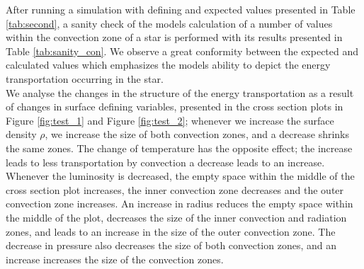 \documentclass[10pt, nofootinbib, twocolumn]{revtex4-1}
\begin{document}
After running a simulation with defining and expected values presented in Table \ref{tab:second}, a sanity check of the models calculation of a number of values within the convection zone of a star is performed with its results presented in Table \ref{tab:sanity_con}. We observe a great conformity between the expected and calculated values which emphasizes the models ability to depict the energy transportation occurring in the star.\\




We analyse the changes in the structure of the energy transportation as a result of changes in surface defining variables, presented in the cross section plots in Figure \ref{fig:test_1} and Figure \ref{fig:test_2}; whenever we increase the surface density $\rho$, we increase the size of both convection zones, and a decrease shrinks the same zones. The change of temperature has the opposite effect; the increase leads to less transportation by convection a decrease leads to an increase. Whenever the luminosity is decreased, the empty space within the middle of the cross section plot increases, the inner convection zone decreases and the outer convection zone increases. An increase in radius reduces the empty space within the middle of the plot, decreases the size of the inner convection and radiation zones, and leads to an increase in the size of the outer convection zone. The decrease in pressure also decreases the size of both convection zones, and an increase increases the size of the convection zones. \\
\end{document}
